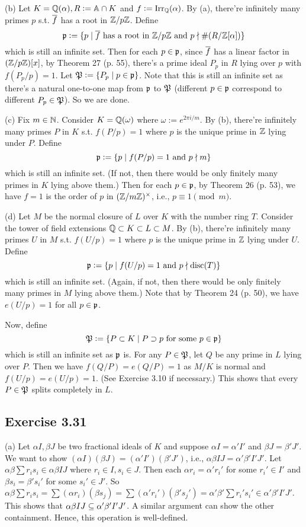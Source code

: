\documentclass[../Marcus.tex]{subfiles}
\begin{document}
(b) Let $K=\mathbb{Q}(\alpha),R:=\mathbb{A}\cap K$ and $f:=\operatorname{Irr}_{\mathbb{Q}}(\alpha)$. By (a), there're infinitely many primes $p$ s.t. $\overline{f}$ has a root in $\mathbb{Z}/p\mathbb{Z}$. Define
$$
\mathfrak{p} := \{p \mid \overline{f} \text{ has a root in } \mathbb{Z}/p\mathbb{Z} \text{ and } p \nmid \#(R/\mathbb{Z}[\alpha]) \}
$$
which is still an infinite set. Then for each $p\in\mathfrak{p}$, since $\overline{f}$ has a linear factor in $(\mathbb{Z}/p\mathbb{Z})[x]$, by Theorem 27 (p. 55), there's a prime ideal $P_p$ in $R$ lying over $p$ with $f(P_p/p)=1$. Let $\mathfrak{P}:=\{P_p \mid p\in\mathfrak{p}\}$. Note that this is still an infinite set as there's a natural one-to-one map from $\mathfrak{p}$ to $\mathfrak{P}$ (different $p\in\mathfrak{p}$ correspond to different $P_p\in\mathfrak{P}$). So we are done.

(c) Fix $m\in\mathbb{N}$. Consider $K=\mathbb{Q}(\omega)$ where $\omega:=e^{2\pi i/m}$. By (b), there're infinitely many primes $P$ in $K$ s.t. $f(P/p)=1$ where $p$ is the unique prime in $\mathbb{Z}$ lying under $P$. Define
$$
\mathfrak{p} := \{p \mid f(P/p) = 1 \text{ and } p \nmid m \}
$$
which is still an infinite set. (If not, then there would be only finitely many primes in $K$ lying above them.) Then for each $p\in\mathfrak{p}$, by Theorem 26 (p. 53), we have $f=1$ is the order of $p$ in $(\mathbb{Z}/m\mathbb{Z})^\times$, i.e., $p\equiv1\pmod{m}$.

(d) Let $M$ be the normal closure of $L$ over $K$ with the number ring $T$. Consider the tower of field extensions $\mathbb{Q} \subset K \subset L \subset M$. By (b), there're infinitely many primes $U$ in $M$ s.t. $f(U/p)=1$ where $p$ is the unique prime in $\mathbb{Z}$ lying under $U$. Define
$$
\mathfrak{p} := \{p \mid f(U/p) = 1 \text{ and } p \nmid \operatorname{disc}(T) \}
$$
which is still an infinite set. (Again, if not, then there would be only finitely many primes in $M$ lying above them.) Note that by Theorem 24 (p. 50), we have $e(U/p)=1$ for all $p\in \mathfrak{p}$.

Now, define
$$
\mathfrak{P} := \{P \subset K \mid P \supset p \text{ for some } p\in\mathfrak{p} \}
$$
which is still an infinite set as $\mathfrak{p}$ is. For any $P\in\mathfrak{P}$, let $Q$ be any prime in $L$ lying over $P$. Then we have $f(Q/P)=e(Q/P)=1$ as $M/K$ is normal and $f(U/p)=e(U/p)=1$. (See Exercise 3.10 if necessary.) This shows that every $P\in\mathfrak{P}$ splits completely in $L$.

\subsection*{Exercise 3.31}

(a) Let $\alpha I,\beta J$ be two fractional ideals of $K$ and suppose $\alpha I=\alpha'I'$ and $\beta J=\beta'J'$. We want to show $(\alpha I)(\beta J)=(\alpha'I')(\beta'J')$, i.e., $\alpha\beta IJ=\alpha'\beta'I'J'$. Let $\alpha\beta\sum r_is_i\in\alpha\beta IJ$ where $r_i\in I,s_i\in J$. Then each $\alpha r_i=\alpha'r_i'$ for some $r_i'\in I'$ and $\beta s_i=\beta's_i'$ for some $s_i'\in J'$. So $\alpha\beta \sum r_is_i=\sum (\alpha r_i)(\beta s_j) = \sum (\alpha'r_i')(\beta's_j') = \alpha'\beta' \sum r_i's_i' \in \alpha'\beta' I'J'$. This shows that $\alpha\beta IJ\subseteq \alpha'\beta'I'J'$. A similar argument can show the other containment. Hence, this operation is well-defined.
\end{document}
